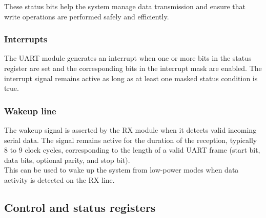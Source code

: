 \documentclass[12pt]{article}
\begin{document}
\noindent These status bits help the system manage data transmission and ensure that write operations 
are performed safely and efficiently.

\subsubsection{Interrupts}
The UART module generates an interrupt when one or more bits in the status register are set 
and the corresponding bits in the interrupt mask are enabled. The interrupt signal remains 
active as long as at least one masked status condition is true.

\subsubsection{Wakeup line}
The wakeup signal is asserted by the RX module when it detects valid incoming serial data. 
The signal remains active for the duration of the reception, typically 8 to 9 clock cycles, 
corresponding to the length of a valid UART frame (start bit, data bits, optional parity, and 
stop bit). \\

\noindent This can be used to wake up the system from low-power modes when data activity is 
detected on the RX line.

\subsection{Control and status registers}
\end{document}
